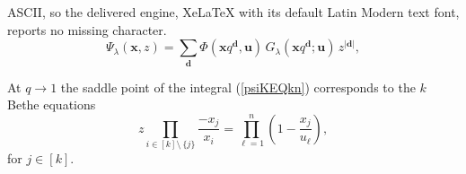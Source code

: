 \documentclass[10pt,a4paper]{amsart}
\newcommand{\db}{\boldsymbol{d}}
\newcommand{\ub}{\boldsymbol{u}}
\newcommand{\xb}{\boldsymbol{x}}
\begin{document}
ASCII, so the delivered engine, XeLaTeX with its default Latin Modern text font, reports no missing character.
\begin{equation} \label{psiKEQkn}
    \Psi_\lambda(\xb,z)
    =\sum_{\db} \Phi(\xb q^{\boldsymbol{d}}, \ub)\, G_{\lambda} \left( \xb  q^{\boldsymbol{d}}; \ub\right)\, z^{|\boldsymbol{d}|}, 
\end{equation}

\begin{proposition}
    At $q\to 1$ the saddle point of the integral (\ref{psiKEQkn}) corresponds to the $k$ Bethe equations
    \begin{equation}
        z \prod \limits_{i\in [k]\setminus\  \{j\}}\frac{-x_j}{x_i} = \prod \limits_{\ell=1}^n \left(1-\frac{x_j}{u_\ell}\right), 
    \end{equation}
    for $j\in [k]$.
\end{proposition}
\end{document}
